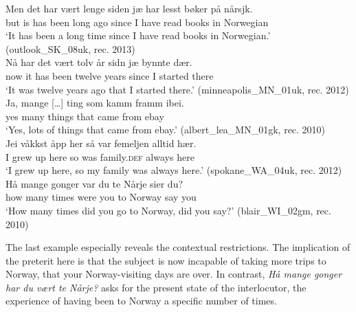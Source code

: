 \documentclass[output=paper]{langscibook}
\begin{document}
\ea%
    \label{ex:eide:24}
    \ea  
    \gll Men det har vært lenge siden   jæ har lesst bøker på nårsjk.      \\
         but is  has been {long ago} since I have read books in Norwegian  \\
    \glt ‘It has been a long time since I have read books in Norwegian.’ (outlook\_SK\_08uk, rec. 2013)\\
    \ex  
    \gll Nå har det vært tolv år sidn jæ bynnte dær.        \\
         now it has been twelve years since I started there \\
    \glt ‘It was twelve years ago that I started there.’ (minneapolis\_MN\_01uk, rec. 2012)\\
    \ex 
    \gll Ja, mange […] ting som kamm framm ibei.   \\
         yes many  {}  things that came from ebay       \\
    \glt ‘Yes, lots of things that came from ebay.’  (albert\_lea\_MN\_01gk, rec. 2010)\\
    \ex  
    \gll Jei våkkst åpp her så var femeljen alltid hær.     \\
         I grew up here so was family.\textsc{def} always here      \\
    \glt ‘I grew up here, so my family was always here.’ (spokane\_WA\_04uk, rec. 2012)\\
    \ex  
    \gll Hå mange gonger var du te Nårje sier du?        \\
         how many times were you to Norway say you      \\
    \glt ‘How many times did you go to Norway, did you say?’  ({blair\_WI\_02gm}, rec. 2010)\\   
    \z %
\z

The last example especially reveals the contextual restrictions. The implication of the preterit here is that the subject is now incapable of taking more trips to Norway, that your Norway-visiting days are over.  In contrast, \textit{Hå mange gonger har du vært te Nårje?} asks for the present state of the interlocutor, the experience of having been to Norway a specific number of times. 
\end{document}
